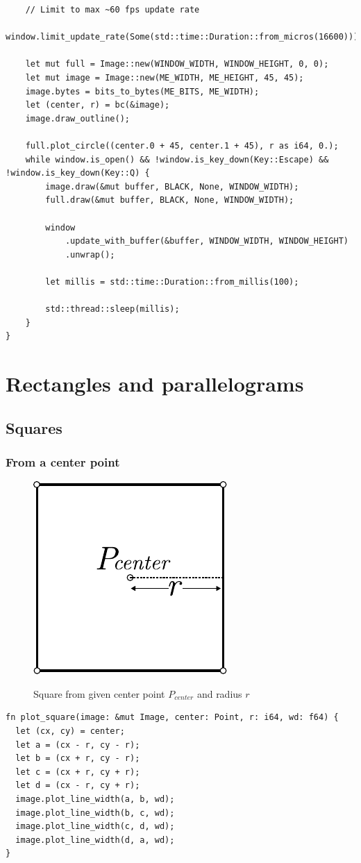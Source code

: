 \documentclass[12pt,openany,a4,usenames,dvipsnames]{book}
\DeclareRobustCommand{\Caption}[1]{\par%
  \vspace{1em}
  {\noindent{}#1}}
\begin{document}
\begin{verbatim}
    // Limit to max ~60 fps update rate
    window.limit_update_rate(Some(std::time::Duration::from_micros(16600)));

    let mut full = Image::new(WINDOW_WIDTH, WINDOW_HEIGHT, 0, 0);
    let mut image = Image::new(ME_WIDTH, ME_HEIGHT, 45, 45);
    image.bytes = bits_to_bytes(ME_BITS, ME_WIDTH);
    let (center, r) = bc(&image);
    image.draw_outline();

    full.plot_circle((center.0 + 45, center.1 + 45), r as i64, 0.);
    while window.is_open() && !window.is_key_down(Key::Escape) && !window.is_key_down(Key::Q) {
        image.draw(&mut buffer, BLACK, None, WINDOW_WIDTH);
        full.draw(&mut buffer, BLACK, None, WINDOW_WIDTH);

        window
            .update_with_buffer(&buffer, WINDOW_WIDTH, WINDOW_HEIGHT)
            .unwrap();

        let millis = std::time::Duration::from_millis(100);

        std::thread::sleep(millis);
    }
}
\end{verbatim}
\clearpage{}
\chapter{Rectangles and parallelograms}
\skelpar%
\section{Squares}
\subsection{From a center point}
\begin{figure}[H]
\centering
\includegraphics[scale=1,keepaspectratio]{figures/square_from_center_point.pdf}
\Caption{Square from given center point $P_{center}$ and radius $r$}
\end{figure}
\begin{verbatim}
fn plot_square(image: &mut Image, center: Point, r: i64, wd: f64) {
  let (cx, cy) = center;
  let a = (cx - r, cy - r);
  let b = (cx + r, cy - r);
  let c = (cx + r, cy + r);
  let d = (cx - r, cy + r);
  image.plot_line_width(a, b, wd);
  image.plot_line_width(b, c, wd);
  image.plot_line_width(c, d, wd);
  image.plot_line_width(d, a, wd);
}
\end{verbatim}
\end{document}

